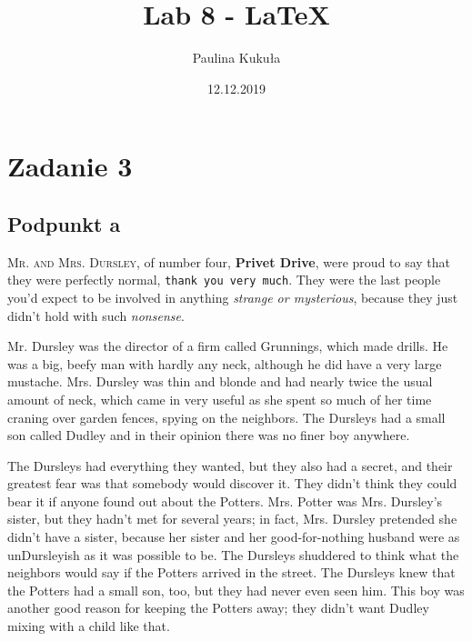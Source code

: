 \documentclass{article}
\author{Paulina Kukuła}            %
\date{12.12.2019}
\title{Lab 8 - \LaTeX}
\begin{document}
\maketitle

\tableofcontents

\newpage

\section{Zadanie 3}
\subsection{Podpunkt a}

\vspace{0,5cm}

\hspace{0,5cm} \textsc{Mr. and Mrs. Dursley}, of number \textnormal{four}, \textbf{Privet Drive}, were proud to say that they were perfectly normal, \texttt{thank you very much}. They were the last people you'd expect to be involved in anything \emph{strange or mysterious}, because they just didn't hold with such \textit{nonsense}.
 
\vspace{0,5cm}
Mr. Dursley was the director of a firm called Grunnings, which made
drills. He was a big, beefy man with hardly any neck, although he did
have a very large mustache. Mrs. Dursley was thin and blonde and had
nearly twice the usual amount of neck, which came in very useful as she
spent so much of her time craning over garden fences, spying on the
neighbors. The Dursleys had a small son called Dudley and in their
opinion there was no finer boy anywhere.

\vspace{0,5cm}
The Dursleys had everything they wanted, but they also had a secret, and
their greatest fear was that somebody would discover it. They didn't
think they could bear it if anyone found out about the Potters. Mrs.
Potter was Mrs. Dursley's sister, but they hadn't met for several years;
in fact, Mrs. Dursley pretended she didn't have a sister, because her
sister and her good-for-nothing husband were as unDursleyish as it was
possible to be. The Dursleys shuddered to think what the neighbors would
say if the Potters arrived in the street. The Dursleys knew that the
Potters had a small son, too, but they had never even seen him. This boy
was another good reason for keeping the Potters away; they didn't want
Dudley mixing with a child like that.
\end{document}
